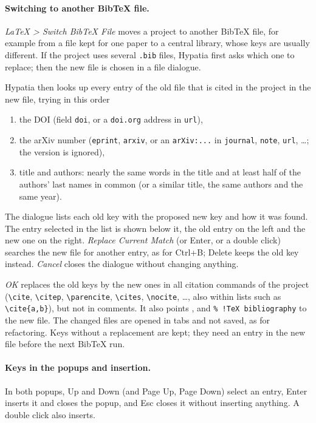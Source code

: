 \documentclass[11pt]{article}
\newcommand{\key}[1]{\textsf{#1}}
\newcommand{\menu}[1]{\textsf{\textit{#1}}}
\begin{document}
    \paragraph{Switching to another BibTeX file.}     \menu{LaTeX > Switch BibTeX File} moves a project to another BibTeX file, for example from a file kept for one paper to a central library, whose keys are usually different. If the project uses several \verb+.bib+ files, Hypatia first asks which one to replace; then the new file is chosen in a file dialogue.

    Hypatia then looks up every entry of the old file that is cited in the project in the new file, trying in this order
    \begin{enumerate}
        \itemsep-1mm
        \item the DOI (field \verb+doi+, or a \verb+doi.org+ address in \verb+url+),
        \item the arXiv number (\verb+eprint+, \verb+arxiv+, or an \verb+arXiv:...+ in \verb+journal+, \verb+note+, \verb+url+, \ldots; the version is ignored),
        \item title and authors: nearly the same words in the title and at least half of the authors' last names in common (or a similar title, the same authors and the same year).
    \end{enumerate}
    The dialogue lists each old key with the proposed new key and how it was found. The entry selected in the list is shown below it, the old entry on the left and the new one on the right. \emph{Replace Current Match} (or \key{Enter}, or a double click) searches the new file for another entry, as for \key{Ctrl+B}; \key{Delete} keeps the old key instead. \emph{Cancel} closes the dialogue without changing anything.

    \emph{OK} replaces the old keys by the new ones in all citation commands of the project (\verb+\cite+, \verb+\citep+, \verb+\parencite+, \verb+\cites+, \verb+\nocite+, \ldots, also within lists such as \verb+\cite{a,b}+), but not in comments. It also points \verb++, \verb++ and \verb+% !TeX bibliography+ to the new file. The changed files are opened in tabs and not saved, as for refactoring. Keys without a replacement are kept; they need an entry in the new file before the next BibTeX run.

    \paragraph{Keys in the popups and insertion.}     In both popups, \key{Up} and \key{Down} (and \key{Page Up}, \key{Page Down}) select an entry, \key{Enter} inserts it and closes the popup, and \key{Esc} closes it without inserting anything. A double click also inserts.
\end{document}
